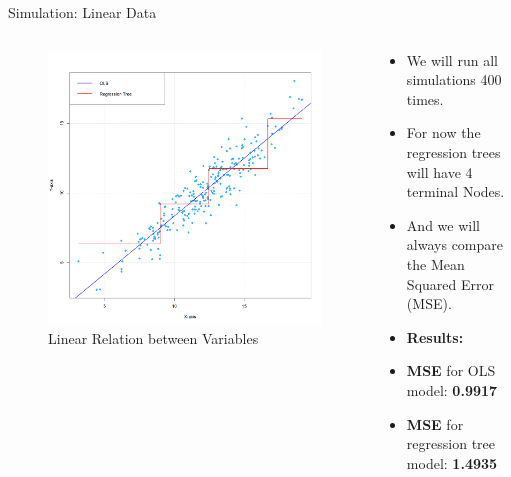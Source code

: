 \documentclass[10pt]{beamer}
\begin{document}
\begin{frame}{Simulation: Linear Data}
    \begin{columns}[T]
        \begin{column}{0.5\textwidth}
        \begin{figure}
            \centering
            \includegraphics[width=1\linewidth]{OLS vs Tree.png}
            \caption{Linear Relation between Variables}
            \label{fig:sub4}  %
            \end{figure}
        \end{column}
        \begin{column}{0.5\textwidth}
        
            \begin{itemize}
                        \vspace{0.7cm}

            \item We will run all simulations 400 times.
                 \item For now the regression trees will have 4 terminal Nodes.
                \item And we will always compare the Mean Squared Error (MSE).
                \vspace{1cm}
                \item \textbf{Results:}
                \item \textbf{MSE} for OLS model: \textbf{0.9917} 
                \item \textbf{MSE} for regression tree model: \textbf{1.4935} 
            \end{itemize}
        \end{column}
    \end{columns}
\end{frame}
\end{document}
